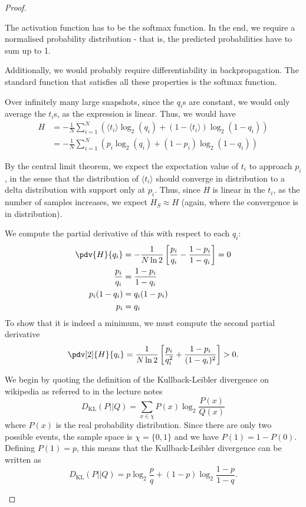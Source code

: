 \begin{proof}
\begin{parts}
\item The activation function has to be the softmax function. In the end, we require a normalised probability distribution - that is, the predicted probabilities have to sum up to 1. 

	Additionally, we would probably require differentiability in backpropagation. The standard function that satisfies all these properties is the softmax function.
\item Over infinitely many large snapshots, since the $q_i$s are constant, we would only average the $t_i$s, as the expression is linear. Thus, we would have
	\begin{align*}
		H &= -\frac{1}{N}\sum_{i=1}^{N} (\langle t_i \rangle \log_2 (q_i) + (1-\langle t_i\rangle) \log_2 (1-q_i)) \\
		&= -\frac{1}{N}\sum_{i=1}^{N} (p_i \log_2 (q_i) + (1-p_i)\log_2(1-q_i)) 
	\end{align*}
\item By the central limit theorem, we expect the expectation value of $t_i$ to approach $p_i$, in the sense that the distribution of $\langle t_i\rangle$ should converge in distribution to a delta distribution with support only at $p_i$. Thus, since $H$ is linear in the $t_i$, as the number of samples increases, we expect $H_S\approx H$ (again, where the convergence is in distribution).
\item We compute the partial derivative of this with respect to each $q_i$:
	\begin{align*}
		\pdv{H}{q_i} &= -\frac{1}{N\ln 2} \left[ \frac{p_i}{q_i}- \frac{1-p_i}{1-q_i} \right]=0 \\
		\frac{p_i}{q_i}&= \frac{1-p_i}{1-q_i} \\
		p_i (1-q_i) &= q_i (1-p_i)\\
p_i &=  q_i 
	\end{align*}
	To show that it is indeed a minimum, we must compute the second partial derivative
	\[
		\pdv[2]{H}{q_i} = \frac{1}{N\ln 2}\left[ \frac{p_i}{q_i^2}+ \frac{1-p_i}{(1-q_i)^2} \right] >0
	.\] 
\item We begin by quoting the definition of the Kullback-Leibler divergence on wikipedia as referred to in the lecture notes
	\[
		D_\text{KL}(P | | Q)=\sum_{x\in \chi} P(x)\log_2 \frac{P(x)}{Q(x)}
	\] 
	where $P(x)$ is the real probability distribution. Since there are only two possible events, the sample space is $\chi = \{0,1\} $ and we have $P(1)=1-P(0) $. Defining $P(1)=p$, this means that the Kullback-Leibler divergence can be written as
	\[
		D_\text{KL}(P | |Q) = p \log_2 \frac{p}{q} + (1-p) \log_2 \frac{1-p}{1-q}
	.\] 


\end{parts}
\end{proof}
